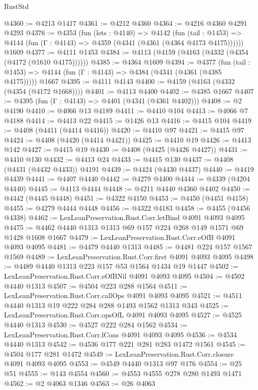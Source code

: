 \begin{lexlean}{RustStd}
\begin{coremodule}
@4360 := @4213 @1417
@4361 := @4212 @4360
@4364 := @4216 @4360 @4291 @4293
@4376 := @4353
    (fun (lets : @4140) =>
    @4142
      (fun (tail : @1453) => @4144 (fun (Γ : @4143) => @4359 (@4341 (@4361 (@4364 @4173 @4175))))))
    @1609
@4377 := @4111 @1453
@4384 := @4113 (@4159 (@4163 (@4332 (@4354 (@4172 (@1610 @4175))))))
@4385 := @4364 @1609
@4394 := @4377
    (fun (tail : @1453) => @4144 (fun (Γ : @4143) => @4384 (@4341 (@4361 (@4385 @4175)))))
    @1667
@4395 := @4111 @4143
@4400 := @4159 (@4163 (@4332 (@4354 (@4172 @1668))))
@4401 := @4113 @4400
@4402 := @4385 @1667
@4407 := @4395 (fun (Γ : @4143) => @4401 (@4341 (@4361 @4402)))
@4408 := @2 @4190
@4410 := @4066 @13 @4189
@4411 := @4410 @104
@4413 := @4066 @7 @4188
@4414 := @4413 @22
@4415 := @1426 @13
@4416 := @4415 @104
@4419 := @4408 (@4411 (@4414 @4416))
@4420 := @4410 @97
@4421 := @4415 @97
@4424 := @4408 (@4420 (@4414 @4421))
@4425 := @4410 @19
@4426 := @4413 @142
@4427 := @4415 @19
@4430 := @4408 (@4425 (@4426 @4427))
@4431 := @4410 @130
@4432 := @4413 @24
@4433 := @4415 @130
@4437 := @4408 (@4431 (@4432 @4433)) @4191
@4439 := @4424 (@4430 @4437)
@4440 := @4419 @4439
@4441 := @4407 @4440
@4442 := @4279 @4400
@4444 := @4339 (@4204 @4440)
@4445 := @4113 @4444
@4448 := @4211 @4440 @4360 @4402
@4450 := @4442 (@4445 @4448)
@4451 := @4322 @4150
@4453 := @4450 (@4451 @4158)
@4455 := @4279 @4444 @4448
@4456 := @4322 @4183
@4458 := @4455 (@4456 @4338)
@4462 := LexLeanPreservation.Rust.Corr.letBind @4091 @4093 @4095
@4475 := @4462 @4440 @1313 @1313 @69 @157 @224 @268 @149 @1571 @69 @1428 @1608 @1667
@4479 := LexLeanPreservation.Rust.Corr.eOfB @4091 @4093 @4095
@4481 := @4479 @4440 @1313
@4485 := @4481 @224 @157 @1567 @1569
@4489 := LexLeanPreservation.Rust.Corr.first @4091 @4093 @4095
@4498 := @4489 @4440 @1313 @223 @157 @53 @1564 @1434 @19 @1447
@4502 := LexLeanPreservation.Rust.Corr.eOfBNil @4091 @4093 @4095
@4504 := @4502 @4440 @1313
@4507 := @4504 @223 @288 @1564
@4511 := LexLeanPreservation.Rust.Corr.callOps @4091 @4093 @4095
@4521 := @4511 @4440 @1313 @19 @222 @284 @288 @1493 @1562 @1313 @343
@4525 := LexLeanPreservation.Rust.Corr.opsOfL @4091 @4093 @4095
@4527 := @4525 @4440 @1313
@4530 := @4527 @222 @284 @1562
@4534 := LexLeanPreservation.Rust.Corr.lCons @4091 @4093 @4095
@4536 := @4534 @4440 @1313
@4542 := @4536 @177 @221 @281 @283 @1472 @1561
@4545 := @4504 @177 @281 @1472
@4549 := LexLeanPreservation.Rust.Corr.closure @4091 @4093 @4095
@4553 := @4549 @4440 @1313 @97 @176
@4554 := @25 @51
@4555 := @143 @4554
@4560 := @4553 @4555 @278 @280 @1493 @1471
@4562 := @2 @4063 @1346
@4563 := @26 @4063

\end{coremodule}
\end{lexlean}
